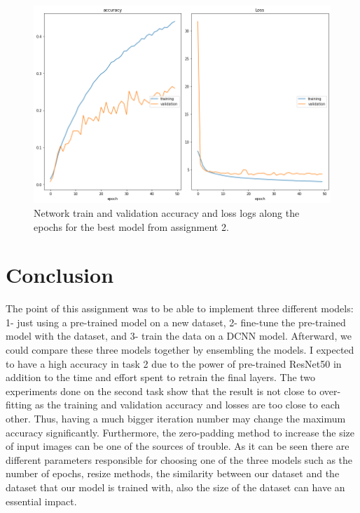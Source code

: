 \documentclass[12pt,oneside,geqno]{article}
\begin{document}
	\begin{figure}
		\centering
		\includegraphics[width=\textwidth]{../figs/q3_acc.png}
		\caption{Network train and validation accuracy and loss logs along the epochs for the best model from assignment 2.}
		\label{img:q3_acc}
	\end{figure}
	
	
	\section{Conclusion}
	The point of this assignment was to be able to implement three different models: 1- just using a pre-trained model on a new dataset, 2- fine-tune the pre-trained model with the dataset, and 3- train the data on a DCNN model. Afterward, we could compare these three models together by ensembling the models. I expected to have a high accuracy in task 2 due to the power of pre-trained ResNet50 in addition to the time and effort spent to retrain the final layers. The two experiments done on the second task show that the result is not close to over-fitting as the training and validation accuracy and losses are too close to each other. Thus, having a much bigger iteration number may change the maximum accuracy significantly. Furthermore, the zero-padding method to increase the size of input images can be one of the sources of trouble. 
	As it can be seen there are different parameters responsible for choosing one of the three models such as the number of epochs, resize methods, the similarity between our dataset and the dataset that our model is trained with, also the size of the dataset can have an essential impact.
	
	
\end{document}
